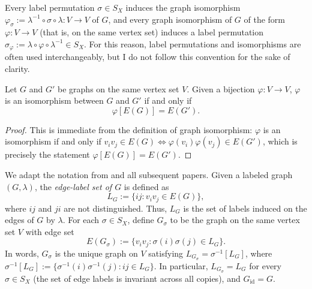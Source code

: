Every label permutation $\sigma\in S_X$ induces the graph isomorphism $\varphi_\sigma:=\lambda^{-1}\circ\sigma\circ\lambda\colon V\to V$ of $G$, and every graph isomorphism of $G$ of the form $\varphi\colon V\to V$ (that is, on the same vertex set) induces a label permutation $\sigma_\varphi:=\lambda\circ\varphi\circ\lambda^{-1}\in S_X$.
For this reason, label permutations and isomorphisms are often used interchangeably, but I do not follow this convention for the sake of clarity.

\begin{center}
\end{center}

\begin{lemma}\label{lemma:varphi-iso-iff-image}
    Let $G$ and $G'$ be graphs on the same vertex set $V$.
    Given a bijection $\varphi\colon V\to V$, $\varphi$ is an isomorphism between $G$ and $G'$ if and only if $$\varphi[E(G)]=E(G').$$
\end{lemma}

\begin{proof}
    This is immediate from the definition of graph isomorphism: $\varphi$ is an isomorphism if and only if $v_iv_j\in E(G)\Leftrightarrow \varphi(v_i)\varphi(v_j)\in E(G')$, which is precisely the statement $\varphi[E(G)]=E(G')$.
\end{proof}

We adapt the notation from \cite{Caro2020GraphsIU} and all subsequent papers.
Given a labeled graph $(G,\lambda)$, the \emph{edge-label set of $G$} is defined as
\[
    L_G:=\{ij : v_iv_j\in E(G)\},
\]
where $ij$ and $ji$ are not distinguished.
Thus, $L_G$ is the set of labels induced on the edges of $G$ by $\lambda$.
For each $\sigma\in S_X$, define $G_\sigma$ to be the graph on the same vertex set $V$ with edge set
\[
    E(G_\sigma):=\{v_iv_j : \sigma(i)\sigma(j)\in L_G\}.
\]
In words, $G_\sigma$ is the unique graph on $V$ satisfying $L_{G_\sigma}=\sigma^{-1}[L_G]$, where $\sigma^{-1}[L_G]:=\{\sigma^{-1}(i)\sigma^{-1}(j):ij\in L_G\}$.
In particular, $L_{G_\sigma}=L_G$ for every $\sigma\in S_X$ (the set of edge labels is invariant across all copies), and $G_{\text{id}}=G$.

